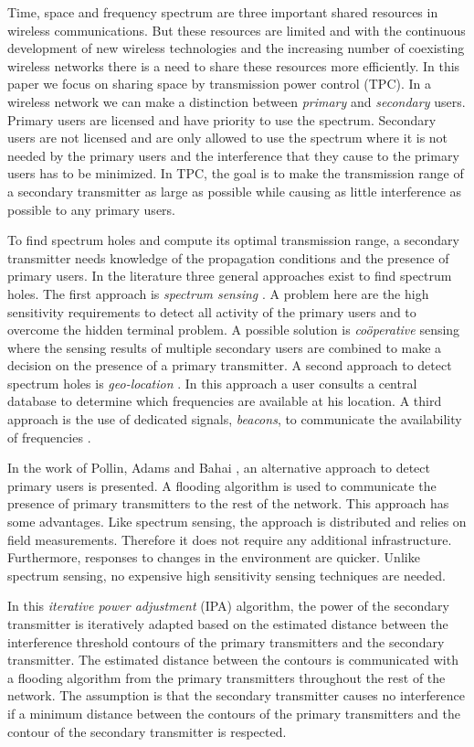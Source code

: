 Time, space and frequency spectrum are three important shared resources in wireless communications. But these resources are limited and with the continuous development of new wireless technologies and the increasing number of coexisting wireless networks there is a need to share these resources more efficiently. 
In this paper we focus on sharing space by transmission power control (TPC). In a wireless network we can make a distinction between \textit{primary} and \textit{secondary} users. Primary users are licensed and have priority to use the spectrum. Secondary users are not licensed and are only allowed to use the spectrum where it is not needed by the primary users and the interference that they cause to the primary users has to be minimized. In TPC, the goal is to make the transmission range of a secondary transmitter as large as possible while causing as little interference as possible to any primary users.

To find spectrum holes and compute its optimal transmission range, a secondary transmitter needs knowledge of the propagation conditions and the presence of primary users. In the literature three general approaches exist to find spectrum holes. The first approach is \textit{spectrum sensing} \cite{sensing1,sensing2}. A problem here are the high sensitivity requirements to detect all activity of the primary users and to overcome the hidden terminal problem. A possible solution is \textit{co\"operative} sensing where the sensing results of multiple secondary users are combined to make a decision on the presence of a primary transmitter. A second approach to detect spectrum holes is \textit{geo-location} \cite{geoLocDyspan}. In this approach a user consults a central database to determine which frequencies are available at his location. A third approach is the use of dedicated signals, \textit{beacons}, to communicate the availability of frequencies \cite{beacon}.

In the work of Pollin, Adams and Bahai \cite{sofie}, an alternative approach to detect primary users is presented. A flooding algorithm is used to communicate the presence of primary transmitters to the rest of the network. This approach has some advantages. Like spectrum sensing, the approach is distributed and relies on field measurements. Therefore it does not require any additional infrastructure. Furthermore, responses to changes in the environment are quicker. Unlike spectrum sensing, no expensive high sensitivity sensing techniques are needed. 

In this \textit{iterative power adjustment} (IPA) algorithm, the power of the secondary transmitter is iteratively adapted based on the estimated distance between the interference threshold contours of the primary transmitters and the secondary transmitter. The estimated distance between the contours is communicated with a flooding algorithm from the primary transmitters throughout the rest of the network. The assumption is that the secondary transmitter causes no interference if a minimum distance between the contours of the primary transmitters and the contour of the secondary transmitter is respected.

